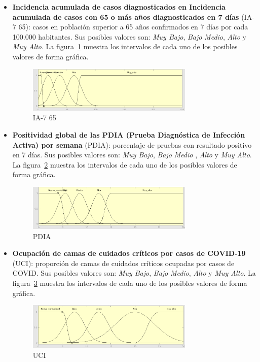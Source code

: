 \documentclass[12pt,a4paper, xcolor=table]{article}
\begin{document}
\begin{itemize}
    \item \textbf{Incidencia acumulada de casos diagnosticados en Incidencia acumulada de casos con 65 o más años diagnosticados en 7 días} (IA-7 65): casos en población superior a 65 años confirmados en 7 días por cada 100.000 habitantes. Sus posibles valores son: \textit{Muy Bajo}, \textit{Bajo} \textit{Medio}, {\textit{Alto}} y {\textit{Muy Alto}}. La figura~\ref{IA-7 65} muestra los intervalos de cada uno de los posibles valores de forma gráfica.

    \begin{figure}[!h]
      \centering
      \includegraphics[width=300px]{img/ia_65_7.png}
      \caption{IA-7 65}
      \label{IA-7 65}
    \end{figure}

    \item \textbf{Positividad global de las PDIA (Prueba Diagnóstica de Infección Activa) por semana} (PDIA): porcentaje de pruebas con resultado positivo en 7 días. Sus posibles valores son: \textit{Muy Bajo}, \textit{Bajo} \textit{Medio }, {\textit{Alto}} y {\textit{Muy Alto}}. La figura~\ref{PDIA} muestra los intervalos de cada uno de los posibles valores de forma gráfica.

    \begin{figure}[!h]
      \centering
      \includegraphics[width=300px]{img/PDIA.png}
      \caption{PDIA}
      \label{PDIA}
    \end{figure}

    \item \textbf{Ocupación de camas de cuidados críticos por casos de COVID-19} (UCI): proporción de camas de cuidados críticos ocupadas por casos de COVID. Sus posibles valores son: \textit{Muy Bajo}, \textit{Bajo} \textit{Medio}, {\textit{Alto}} y {\textit{Muy Alto}}. La figura~\ref{cUCI} muestra los intervalos de cada uno de los posibles valores de forma gráfica.

    \begin{figure}[!h]
      \centering
      \includegraphics[width=300px]{img/camas_UCI.png}
      \caption{UCI}
      \label{cUCI}
    \end{figure}


\end{itemize}
\end{document}
